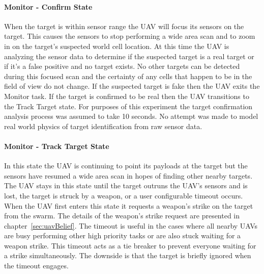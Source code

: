 \begin{multicols*}{2}
	
\paragraph{Monitor - Confirm State}
When the target is within sensor range the UAV will focus its sensors on the target.  This causes the sensors to stop performing a wide area scan and to zoom in on the target's suspected world cell location.  At this time the UAV is analyzing the sensor data to determine if the suspected target is a real target or if it's a false positive and no target exists.  No other targets can be detected during this focused scan and the certainty of any cells that happen to be in the field of view do not change.  If the suspected target is fake then the UAV exits the Monitor task.  If the target is confirmed to be real then the UAV transitions to the Track Target state.  For purposes of this experiment the target confirmation analysis process was assumed to take 10 seconds.  No attempt was made to model real world physics of target identification from raw sensor data.


\paragraph{Monitor - Track Target State}
In this state the UAV is continuing to point its payloads at the target but the sensors have resumed a wide area scan in hopes of finding other nearby targets.  The UAV stays in this state until the target outruns the UAV's sensors and is lost, the target is struck by a weapon, or a user configurable timeout occurs.  When the UAV first enters this state it requests a weapon's strike on the target from the swarm.  The details of the weapon's strike request are presented in chapter~\ref{sec:uavBelief}.  The timeout is useful in the cases where all nearby UAVs are busy performing other high priority tasks or are also stuck waiting for a weapon strike.  This timeout acts as a tie breaker to prevent everyone waiting for a strike simultaneously.  The downside is that the target is briefly ignored when the timeout engages.


\end{multicols*}
